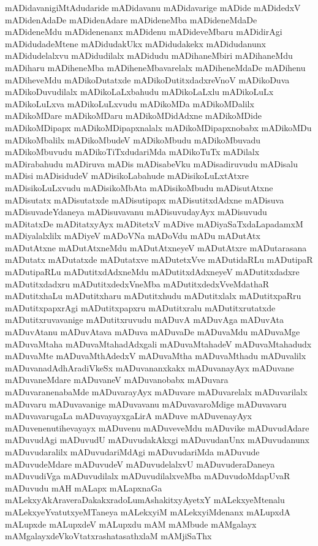 {mADidavanigiMtAdudaride
mADidavanu
mADidavarige
mADide
mADidedxV
mADidenAdaDe
mADidenAdare
mADideneMba
mADideneMdaDe
mADideneMdu
mADidenenanx
mADidenu
mADideveMbaru
mADidirAgi
mADidudadeMtene
mADidudakUkx
mADidudakekx
mADidudanunx
mADidudelalxvu
mADidudilalx
mADidudu
mADihaneMbiri
mADihaneMdu
mADiharu
mADiheneMba
mADiheneMbavarelalx
mADiheneMdaDe
mADihenu
mADiheveMdu
mADikoDutatxde
mADikoDutitxdadxreVnoV
mADikoDuva
mADikoDuvudilalx
mADikoLaLxbahudu
mADikoLaLxlu
mADikoLuLx
mADikoLuLxva
mADikoLuLxvudu
mADikoMDa
mADikoMDalilx
mADikoMDare
mADikoMDaru
mADikoMDidAdxne
mADikoMDide
mADikoMDipapx
mADikoMDipapxnalalx
mADikoMDipapxnobabx
mADikoMDu
mADikoMbalilx
mADikoMbudeV
mADikoMbudu
mADikoMbuvadu
mADikoMbuvudu
mADikoTiTxdudariMda
mADikoTuTx
mADilalx
mADirabahudu
mADiruva
mADis
mADisabeVku
mADisadiruvudu
mADisalu
mADisi
mADisidudeV
mADisikoLabahude
mADisikoLuLxtAtxre
mADisikoLuLxvudu
mADisikoMbAta
mADisikoMbudu
mADisutAtxne
mADisutatx
mADisutatxde
mADisutipapx
mADisutitxdAdxne
mADisuva
mADisuvadeYdaneya
mADisuvavanu
mADisuvudayAyx
mADisuvudu
mADitatxDe
mADitatxyAyx
mADitetxV
mADive
mADiyaSaTxdaLapadamxM
mADiyalalxlilx
mADiyeV
mADoVNa
mADoVdu
mADu
mADutAtx
mADutAtxne
mADutAtxneMdu
mADutAtxneyeV
mADutAtxre
mADutarasana
mADutatx
mADutatxde
mADutatxve
mADutetxVve
mADutidaRLu
mADutipaR
mADutipaRLu
mADutitxdAdxneMdu
mADutitxdAdxneyeV
mADutitxdadxre
mADutitxdadxru
mADutitxdedxVneMba
mADutitxdedxVveMdathaR
mADutitxhaLu
mADutitxharu
mADutitxhudu
mADutitxlalx
mADutitxpaRru
mADutitxpapxrAgi
mADutitxpapxru
mADutitxralu
mADutitxrutatxde
mADutitxruvavanige
mADutitxruvudu
mADuvA
mADuvAga
mADuvAta
mADuvAtanu
mADuvAtava
mADuva
mADuvaDe
mADuvaMdu
mADuvaMge
mADuvaMtaha
mADuvaMtahadAdxgali
mADuvaMtahadeV
mADuvaMtahadudx
mADuvaMte
mADuvaMthAdedxV
mADuvaMtha
mADuvaMthadu
mADuvalilx
mADuvanadAdhAradiVkeSx
mADuvananxkakx
mADuvanayAyx
mADuvane
mADuvaneMdare
mADuvaneV
mADuvanobabx
mADuvara
mADuvaranenabaMde
mADuvarayAyx
mADuvare
mADuvarelalx
mADuvarilalx
mADuvaru
mADuvavanige
mADuvavanu
mADuvavaroMdige
mADuvavaru
mADuvavarugaLa
mADuvayayxgaLirA
mADuve
mADuvenayAyx
mADuvenenutihevayayx
mADuvenu
mADuveveMdu
mADuvike
mADuvudAdare
mADuvudAgi
mADuvudU
mADuvudakAkxgi
mADuvudanUnx
mADuvudanunx
mADuvudaralilx
mADuvudariMdAgi
mADuvudariMda
mADuvude
mADuvudeMdare
mADuvudeV
mADuvudelalxvU
mADuvuderaDaneya
mADuvudiVga
mADuvudilalx
mADuvudilalxveMba
mADuvudoMdapUvaR
mADuvudu
mAH
mALapx
mALapxnaGa
mALekxyAkAraveraDakakxradoLumAshakitxyAyetxY
mALekxyeMtenalu
mALekxyeYvatutxyeMTaneya
mALekxyiM
mALekxyiMdenanx
mALupxdA
mALupxde
mALupxdeV
mALupxdu
mAM
mAMbude
mAMgalayx
mAMgalayxdeVkoVtatxrashatasathxlaM
mAMjiSaThx
}
